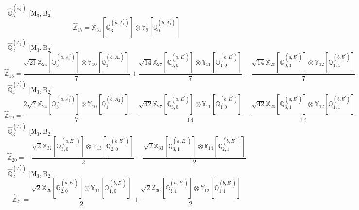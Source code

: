 \documentclass[fleqn,10pt,landscape]{article}
\begin{document}
\begin{itemize}
\begin{dmath*}
\end{dmath*}
\vspace{4mm}
\noindent {} $\,\,\,\hat{\mathbb{Q}}_{3}^{(A_{1}^{\prime})}$ [M$_{3}$,\,B$_{2}$]
\begin{dmath*}
\hat{\mathbb{Z}}_{17}=\mathbb{X}_{31}[\mathbb{Q}_{3}^{(a,A_{1}^{\prime})}] \otimes\mathbb{Y}_{9}[\mathbb{Q}_{0}^{(b,A_{1}^{\prime})}]
\end{dmath*}
\vspace{4mm}
\noindent {} $\,\,\,\hat{\mathbb{Q}}_{2}^{(A_{1}^{\prime})}$ [M$_{3}$,\,B$_{2}$]
\begin{dmath*}
\hat{\mathbb{Z}}_{18}=\frac{\sqrt{21} \mathbb{X}_{24}[\mathbb{Q}_{3}^{(a,A_{2}^{\prime\prime})}] \otimes\mathbb{Y}_{10}[\mathbb{Q}_{1}^{(b,A_{2}^{\prime\prime})}]}{7} + \frac{\sqrt{14} \mathbb{X}_{27}[\mathbb{Q}_{3,0}^{(a,E^{\prime})}] \otimes\mathbb{Y}_{11}[\mathbb{Q}_{1,0}^{(b,E^{\prime})}]}{7} + \frac{\sqrt{14} \mathbb{X}_{28}[\mathbb{Q}_{3,1}^{(a,E^{\prime})}] \otimes\mathbb{Y}_{12}[\mathbb{Q}_{1,1}^{(b,E^{\prime})}]}{7}
\end{dmath*}
\vspace{4mm}
\noindent {} $\,\,\,\hat{\mathbb{Q}}_{4}^{(A_{1}^{\prime})}$ [M$_{3}$,\,B$_{2}$]
\begin{dmath*}
\hat{\mathbb{Z}}_{19}=\frac{2 \sqrt{7} \mathbb{X}_{24}[\mathbb{Q}_{3}^{(a,A_{2}^{\prime\prime})}] \otimes\mathbb{Y}_{10}[\mathbb{Q}_{1}^{(b,A_{2}^{\prime\prime})}]}{7} - \frac{\sqrt{42} \mathbb{X}_{27}[\mathbb{Q}_{3,0}^{(a,E^{\prime})}] \otimes\mathbb{Y}_{11}[\mathbb{Q}_{1,0}^{(b,E^{\prime})}]}{14} - \frac{\sqrt{42} \mathbb{X}_{28}[\mathbb{Q}_{3,1}^{(a,E^{\prime})}] \otimes\mathbb{Y}_{12}[\mathbb{Q}_{1,1}^{(b,E^{\prime})}]}{14}
\end{dmath*}
\vspace{4mm}
\noindent {} $\,\,\,\hat{\mathbb{Q}}_{3}^{(A_{1}^{\prime})}$ [M$_{3}$,\,B$_{2}$]
\begin{dmath*}
\hat{\mathbb{Z}}_{20}=- \frac{\sqrt{2} \mathbb{X}_{32}[\mathbb{Q}_{3,0}^{(a,E^{\prime\prime})}] \otimes\mathbb{Y}_{13}[\mathbb{Q}_{2,0}^{(b,E^{\prime\prime})}]}{2} - \frac{\sqrt{2} \mathbb{X}_{33}[\mathbb{Q}_{3,1}^{(a,E^{\prime\prime})}] \otimes\mathbb{Y}_{14}[\mathbb{Q}_{2,1}^{(b,E^{\prime\prime})}]}{2}
\end{dmath*}
\vspace{4mm}
\noindent {} $\,\,\,\hat{\mathbb{Q}}_{2}^{(A_{1}^{\prime})}$ [M$_{3}$,\,B$_{2}$]
\begin{dmath*}
\hat{\mathbb{Z}}_{21}=\frac{\sqrt{2} \mathbb{X}_{29}[\mathbb{G}_{2,0}^{(a,E^{\prime})}] \otimes\mathbb{Y}_{11}[\mathbb{Q}_{1,0}^{(b,E^{\prime})}]}{2} + \frac{\sqrt{2} \mathbb{X}_{30}[\mathbb{G}_{2,1}^{(a,E^{\prime})}] \otimes\mathbb{Y}_{12}[\mathbb{Q}_{1,1}^{(b,E^{\prime})}]}{2}

\end{dmath*}
\end{itemize}
\end{document}
